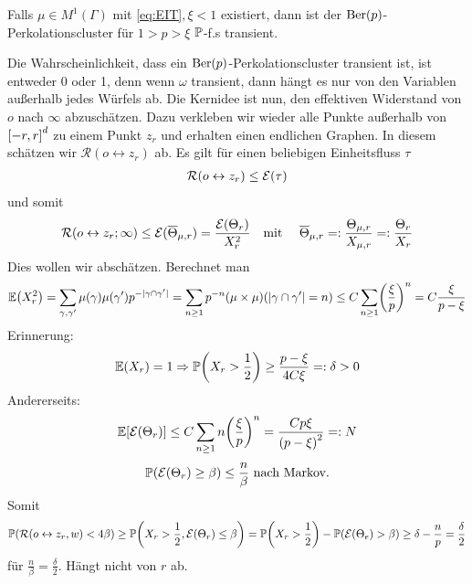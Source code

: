 \begin{satz}
	Falls $\mu \in M^1(\Gamma)$ mit \ref{eq:EIT}$, \xi < 1 $ existiert, dann ist der $\operatorname{Ber}(p)$-Perkolationscluster für $1 > p > \xi$ $\mathbb{P}$-f.s transient.
\end{satz}
\begin{beweis}
	Die Wahrscheinlichkeit, dass ein $\operatorname{Ber}(p)$-Perkolationscluster transient ist, ist entweder 0 oder 1, denn wenn $\omega$ transient, dann hängt es nur von den Variablen außerhalb jedes Würfels ab. Die Kernidee ist nun, den effektiven Widerstand von $o$ nach $\infty$ abzuschätzen. Dazu verkleben wir wieder alle Punkte außerhalb von $\left\lbrack-r,r\right\rbrack^d$ zu einem Punkt $z_r$ und erhalten einen endlichen Graphen. In diesem schätzen wir $\mathcal{R}(o \leftrightarrow z_r)$ ab. Es gilt für einen beliebigen Einheitsfluss $\tau$
	\begin{align}
		\mathcal{R}\enb{o \leftrightarrow z_r} \leq \mathcal{E}(\tau)
	\end{align}
	und somit
	\begin{align}
		\mathcal{R}(o \leftrightarrow z_r;\infty) \leq \mathcal{E}(\overline{\Theta}_{\mu,r}) = \frac{\mathcal{E}(\Theta_r)}{X^2_r} && \text{mit \quad } \overline{\Theta}_{\mu,r} =: \frac{\Theta_{\mu,r}}{X_{\mu,r}}=:\frac{\Theta_r}{X_r}
	\end{align}
	Dies wollen wir abschätzen.	Berechnet man 
	\begin{align}
		\EW{X^2_r} = \sum\limits_{\gamma,\gamma'}\mu(\gamma)\mu(\gamma')p^{-\abs{\gamma \cap \gamma'}} = \sum\limits_{n \geq 1} p^{-n} \enb{\mu \times \mu}\enb{\abs{\gamma \cap \gamma'} = n} \leq C \sum\limits_{n \geq 1} \enb{\frac{\xi}{p}}^n = C \frac{\xi}{p - \xi}
	\end{align}
	Erinnerung:
	\begin{align}
		\EW{X_r} = 1 \Rightarrow \prop{X_r > \frac{1}{2}} \geq \frac{p - \xi}{4C\xi} =: \delta > 0
	\end{align}
	Andererseits:
	\begin{align}
		\EWE{ \mathcal{E}(\Theta_r)} \leq C \sum\limits_{n \geq 1} n \enb{\frac{\xi}{p}}^n = \frac{Cp\xi}{\enb{p-\xi}^2}=: N
	\end{align}
	\begin{align}
		\propE{\mathcal{E}(\Theta_r) \geq \beta } \leq \frac{n}{\beta} \text{ nach Markov}. 
	\end{align}
	Somit 
	\begin{align}
		\propE{\mathcal{R}(o \leftrightarrow z_r,w) < 4\beta} \geq \propE{X_r > \frac{1}{2}, \mathcal{E}(\Theta_r) \leq \beta} = \propE{X_r > \frac{1}{2}} - \propE{\mathcal{E}(\Theta_e)> \beta} \geq \delta-\frac{n}{p} = \frac{\delta}{2} 
	\end{align}
	für $\frac{n}{\beta} = \frac{\delta}{2}$. Hängt nicht von $r$ ab.


\end{beweis}
